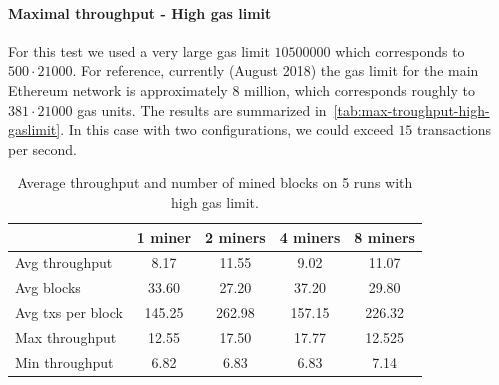 \paragraph{Maximal throughput - High gas limit}
\label{sec:max-throughput-high-gaslimit}
For this test we used a very large gas limit $10500000$ which corresponds to $500
\cdot 21000$. For reference, currently
(August 2018) the gas limit for the main Ethereum network is approximately $8$
million, which corresponds roughly to $381 \cdot 21000$ gas units. The results are
summarized in~\autoref{tab:max-troughput-high-gaslimit}. In this case with two
configurations, we could exceed $15$ transactions per second.

\begin{table}[h!]
  \centering
  \begin{tabular}{l | cccc}
    & 1 miner & 2 miners & 4 miners & 8 miners \\ \hline
    Avg throughput & 8.17 & 11.55 & 9.02 & 11.07 \\
    Avg blocks & 33.60 & 27.20 & 37.20 & 29.80 \\
    Avg txs per block & 145.25 & 262.98 & 157.15 & 226.32  \\
    Max throughput & 12.55 & 17.50 & 17.77 & 12.525 \\
    Min throughput & 6.82 & 6.83 & 6.83 & 7.14 \\
  \end{tabular}
  \caption{Average throughput and number of mined blocks on 5 runs with high gas limit.}
  \label{tab:max-troughput-high-gaslimit}
\end{table}
